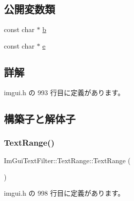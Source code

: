 \subsection*{公開変数類}
\begin{DoxyCompactItemize}
\item 
const char $\ast$ \mbox{\hyperlink{struct_im_gui_text_filter_1_1_text_range_a705cf9c8fb0796b3bab9cf20cb18b0ca}{b}}
\item 
const char $\ast$ \mbox{\hyperlink{struct_im_gui_text_filter_1_1_text_range_a20daef0e47167d49a017d8f54cb7c607}{e}}
\end{DoxyCompactItemize}


\subsection{詳解}


 imgui.\+h の 993 行目に定義があります。



\subsection{構築子と解体子}
\mbox{\label{struct_im_gui_text_filter_1_1_text_range_a5a6548fd40884ef5837e6a1ffa33af61}} 
\subsubsection{\texorpdfstring{Text\+Range()}{TextRange()}\hspace{0.1cm}{\footnotesize\ttfamily [1/2]}}
{\footnotesize\ttfamily Im\+Gui\+Text\+Filter\+::\+Text\+Range\+::\+Text\+Range (\begin{DoxyParamCaption}{ }\end{DoxyParamCaption})\hspace{0.3cm}{\ttfamily [inline]}}



 imgui.\+h の 998 行目に定義があります。

